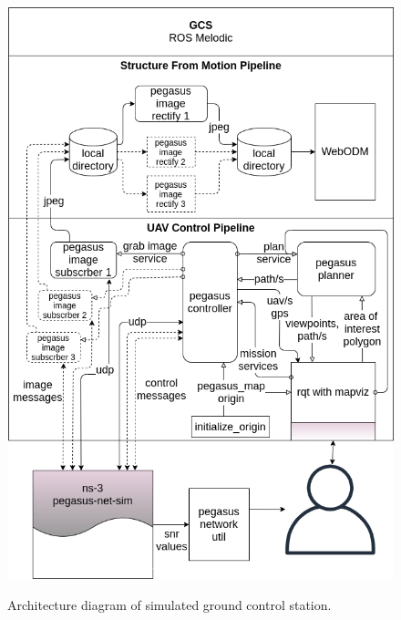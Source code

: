 \begin{figure}
	\centering
	\caption[Pegasus system simulaion overview]{\small Architecture diagram of simulated ground control station.}
	\includegraphics[width=5in]{figures/methodology/methodology-gcs-components-simulated}
	\label{fig:gcs-components-simulated}
\end{figure}

